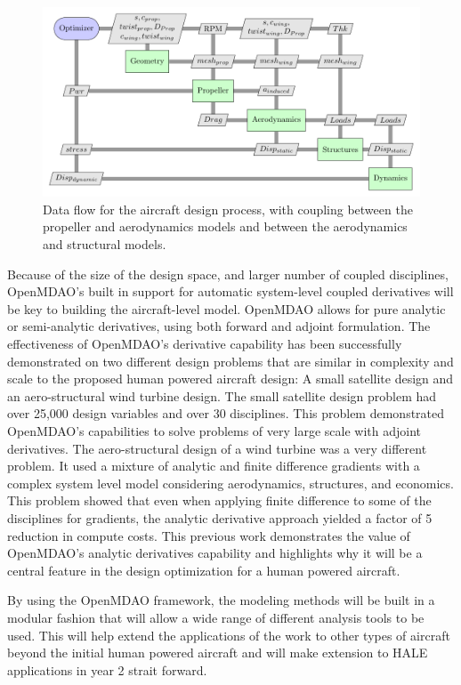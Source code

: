 \documentclass[]{aiaa-tc}
\begin{document}
    \begin{figure} \centering
        \includegraphics[width=.75\textwidth]{xdsm/overall}
        \caption{Data flow for the aircraft design process, with coupling between the propeller and aerodynamics models 
        and between the aerodynamics and structural models. }
        \label{fig:n2}
    \end{figure}

    Because of the size of the design space, and larger number of coupled disciplines, OpenMDAO's built in support for 
    automatic system-level coupled derivatives will be key to building the aircraft-level model. OpenMDAO allows for 
    pure analytic or semi-analytic derivatives, using both forward and adjoint formulation. The effectiveness of OpenMDAO's 
    derivative capability has been successfully demonstrated on two different design problems that are similar in complexity 
    and scale to the proposed human powered aircraft design: A small satellite design and an aero-structural 
    wind turbine design\cite{gray2014derivatives}. The small satellite design problem had over 25,000 design variables 
    and over 30 disciplines. This problem demonstrated OpenMDAO's capabilities to solve problems of very large scale with adjoint 
    derivatives. The aero-structural design of a wind turbine was a very different problem. It used a mixture of analytic and 
    finite difference gradients with a complex system level model considering aerodynamics, structures, and economics. 
    This problem showed that even when applying finite difference to some of the disciplines for gradients, the analytic 
    derivative approach yielded a factor of 5 reduction in compute costs. This previous work demonstrates the 
    value of OpenMDAO's analytic derivatives capability and highlights why it will be a central feature in the design 
    optimization for a human powered aircraft. 

    By using the OpenMDAO framework, the modeling methods will be built in a modular fashion that will allow a wide range of
    different analysis tools to be used. This will help extend the applications of the work to other types of aircraft beyond the 
    initial human powered aircraft and will make extension to HALE applications in year 2 strait forward. 
\end{document}
